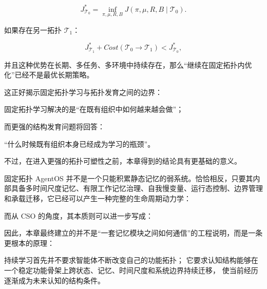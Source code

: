 \[
J_{\mathcal{T}_0}^{*}
=
\inf_{\pi,\mu,R,B}
J
(
\pi,\mu,R,B
\mid
\mathcal{T}_0
).
\]

如果存在另一拓扑 $\mathcal{T}_1$：

\[
J_{\mathcal{T}_1}^{*}
+
Cost(\mathcal{T}_0\rightarrow\mathcal{T}_1)
<
J_{\mathcal{T}_0}^{*},
\]

并且这种优势在长期、多任务、多环境中持续存在，那么“继续在固定拓扑内优化”已经不是最优长期策略。

这正好揭示固定拓扑学习与拓扑发育之间的边界：

\begin{remark}
固定拓扑学习解决的是“在既有组织中如何越来越会做”；
\end{remark}

而更强的结构发育问题将回答：

\begin{statementbox}
“什么时候既有组织本身已经成为学习的瓶颈”。
\end{statementbox}

不过，在进入更强的拓扑可塑性之前，本章得到的结论具有更基础的意义。

固定拓扑 AgentOS 并不是一个只能积累静态记忆的弱系统。恰恰相反，只要其内部具备多时间尺度记忆、有限工作记忆治理、自我慢变量、运行态控制、边界管理和承载迁移，它已经可以产生一种完整的生命周期动力学：

\begin{statementbox}
\centering
{}
\end{statementbox}

而从 CSO 的角度，其本质则可以进一步写成：

\begin{statementbox}
\centering
{}
\end{statementbox}

因此，本章最终建立的并不是“一套记忆模块之间如何通信”的工程说明，而是一条更根本的原理：

\begin{statementbox}
持续学习首先并不要求智能体不断改变自己的功能拓扑；
它要求认知结构能够在一个稳定功能骨架上跨状态、记忆、时间尺度和系统边界持续迁移，
使当前经历逐渐成为未来认知的结构条件。
\end{statementbox}

